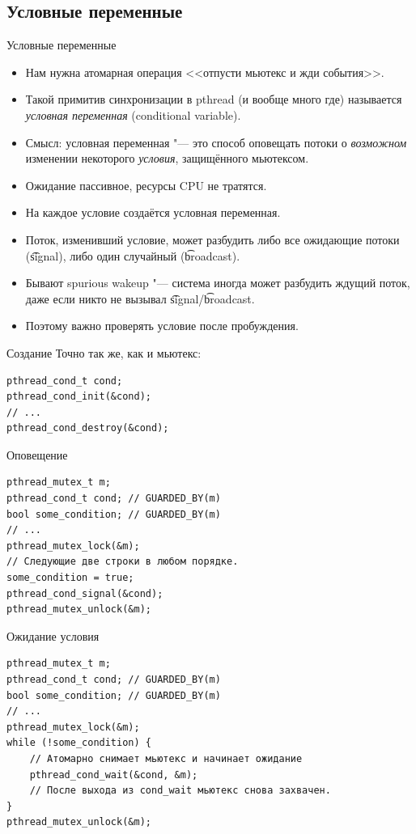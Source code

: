 \subsection{Условные переменные}

\begin{frame}{Условные переменные}
	\begin{itemize}
		\item Нам нужна атомарная операция <<отпусти мьютекс и жди события>>.
		\item Такой примитив синхронизации в pthread (и вообще много где) называется \textit{условная переменная} (conditional variable).
		\item Смысл: условная переменная "--- это способ оповещать потоки о \textit{возможном} изменении некоторого \textit{условия}, защищённого мьютексом.
		\item Ожидание пассивное, ресурсы CPU не тратятся.
		\item На каждое условие создаётся условная переменная.
		\item Поток, изменивший условие, может разбудить либо все ожидающие потоки (\t{signal}), либо один случайный (\t{broadcast}).
		\item Бывают spurious wakeup "--- система иногда может разбудить ждущий поток, даже если никто не вызывал \t{signal}/\t{broadcast}.
		\item Поэтому важно проверять условие после пробуждения.
	\end{itemize}
\end{frame}

\begin{frame}[fragile]{Создание}
	Точно так же, как и мьютекс:
\begin{verbatim}
pthread_cond_t cond;
pthread_cond_init(&cond);
// ...
pthread_cond_destroy(&cond);
\end{verbatim}
\end{frame}

\begin{frame}[fragile]{Оповещение}
\begin{verbatim}
pthread_mutex_t m;
pthread_cond_t cond; // GUARDED_BY(m)
bool some_condition; // GUARDED_BY(m)
// ...
pthread_mutex_lock(&m);
// Следующие две строки в любом порядке.
some_condition = true;
pthread_cond_signal(&cond);
pthread_mutex_unlock(&m);
\end{verbatim}
\end{frame}

\begin{frame}[fragile]{Ожидание условия}
\begin{verbatim}
pthread_mutex_t m;
pthread_cond_t cond; // GUARDED_BY(m)
bool some_condition; // GUARDED_BY(m)
// ...
pthread_mutex_lock(&m);
while (!some_condition) {
    // Атомарно снимает мьютекс и начинает ожидание
    pthread_cond_wait(&cond, &m);
    // После выхода из cond_wait мьютекс снова захвачен.
}
pthread_mutex_unlock(&m);
\end{verbatim}
\end{frame}

